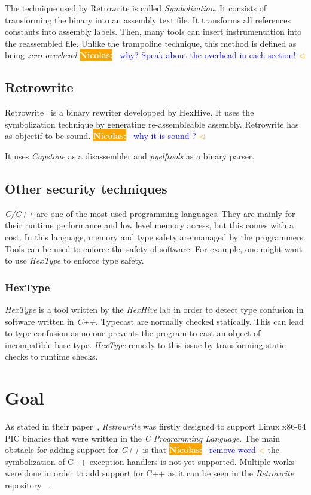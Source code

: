 \documentclass[a4paper,11pt,oneside]{report}
\newcommand{\sysname}{Retrowrite\xspace}
\newcommand{\todobox}[3]{%
    \colorbox{#1}{\textcolor{white}{\sffamily\bfseries\scriptsize #2}}%
    ~\textcolor{blue}{#3} %
    \textcolor{#1}{$\triangleleft$}%
}
\newcommand{\nb}[1]{\todobox{orange}{Nicolas:}{#1}}
\begin{document}
The technique used by \sysname is called \textit{Symbolization}. It
consists of transforming the binary into an assembly text file. It transforms
all references constants into assembly labels. Then, many tools can insert
instrumentation into the reassembled file. Unlike the trampoline technique,
this method is defined as being \textit{zero-overhead} \nb{why? Speak about the
overhead in each section!}

\section{Retrowrite}
Retrowrite~\cite{dinesh20oakland} is a binary rewriter developped by HexHive. It uses the
symbolization technique by generating re-assembleable assembly. Retrowrite has as objectif to be sound. \nb{why it is sound ?}
It uses \textit{Capstone} as a disassembler and \textit{pyelftools} as a binary
parser.

\section{Other security techniques}
\textit{C/C++} are one of the most used programming languages. They are
mainly for their runtime performance and low level memory access, but this
comes with a cost. In this language, memory and type safety are managed by the
programmers. Tools can be used to enforce the safety of software. For example,
one might want to use \textit{HexType} to enforce type safety.
\subsection{HexType}
\textit{HexType} is a tool written by the \textit{HexHive} lab in order to
detect type confusion in software written in \textit{C++}. Typecast are
normally checked statically. This can lead to type confusion as no one prevents
the program to cast an object of incompatible base type. \textit{HexType}
remedy to this issue by transforming static checks to runtime checks.


\chapter{Goal}
As stated in their paper~\cite{dinesh20oakland}, \textit{Retrowrite} was
firstly designed to support Linux x86-64 PIC binaries that were written in the
\textit{C Programming Language}.
The main obstacle for adding support for \textit{C++} is that \nb{remove word}the symbolization
of C++ exception handlers is not yet supported. Multiple works were done in order to
add support for C++ as it can be seen in the \textit{Retrowrite} repository
~\cite{gitCommit}.
\end{document}
